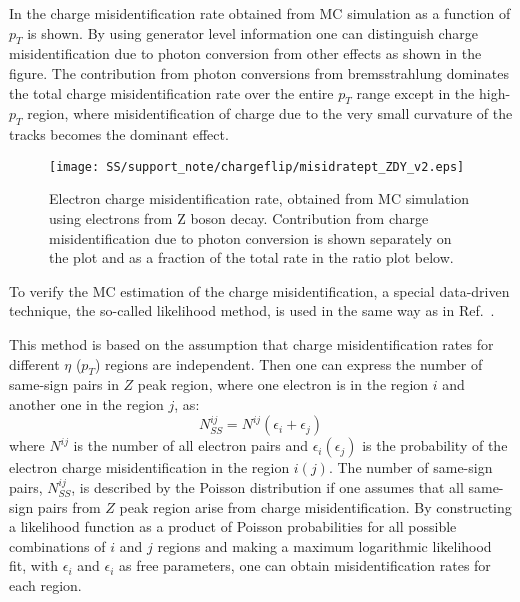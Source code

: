 In  the charge misidentification rate obtained from MC simulation as a function of $p_T$ is shown.
By using generator level information one can distinguish charge misidentification due to photon conversion from other effects as shown in the figure.
The contribution from photon conversions from bremsstrahlung dominates 
the total charge misidentification rate over the entire $p_T$ range except in the high-$p_T$ region, where misidentification 
of charge due to the very small curvature of the tracks becomes the dominant effect.

\begin{figure}
\begin{center}
 \texttt{[image: SS/support\_note/chargeflip/misidratept\_ZDY\_v2.eps]}
\caption{Electron charge misidentification rate, obtained from MC simulation using electrons from Z boson decay. 
Contribution from charge misidentification due to photon conversion is shown separately on the plot and as a fraction of the total rate in the ratio plot below.}
\label{fig:chargeFlip_structure}
\end{center}
\end{figure}

To verify the MC estimation of the charge misidentification, a special data-driven technique, the so-called likelihood method, 
is used in the same way as in Ref.~\cite{same_sign_paper_7tev}.


This method is based on the assumption that charge misidentification rates for different $\eta$ ($p_T$) regions are independent.
Then one can express the number of same-sign pairs in $Z$ peak region, where one electron is in the region $i$ and another one in the region $j$, as:
\begin{equation}
 N_{SS}^{ij} = N^{ij}(\epsilon_i+\epsilon_j)
\end{equation}
where $N^{ij}$ is the number of all electron pairs and $\epsilon_i (\epsilon_j)$ is the probability of the electron charge misidentification in the region $i (j)$. The number of same-sign pairs, $N_{SS}^{ij}$, is described by the Poisson distribution if one assumes that all same-sign pairs from $Z$ peak region arise from charge misidentification. 
By constructing a likelihood function as a product of Poisson probabilities for all possible combinations of $i$ and $j$ regions and making a maximum logarithmic likelihood fit, with $\epsilon_i$ and $\epsilon_i$ as free parameters, one can obtain misidentification rates for each region.


